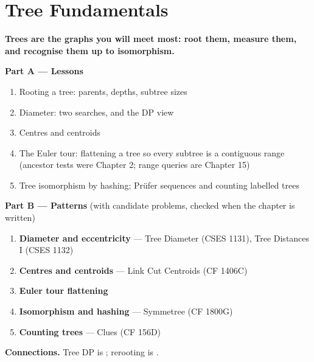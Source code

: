 \chapter{Tree Fundamentals}
\label{ch:tree_basics}

\begin{tcolorbox}[enhanced, colback=white, colframe=secondaryblue, boxrule=1pt, arc=2mm]
\textbf{\large\textcolor{primaryblue}{Trees are the graphs you will meet most: root them, measure them, and recognise them up to isomorphism.}}
\end{tcolorbox}


\begin{plannedbox}
\textbf{Part A --- Lessons}
\begin{enumerate}[leftmargin=*, label=\textbf{A\arabic*.}, itemsep=1pt]
    \item Rooting a tree: parents, depths, subtree sizes
    \item Diameter: two searches, and the DP view
    \item Centres and centroids
    \item The Euler tour: flattening a tree so every subtree is a contiguous range (ancestor tests were Chapter 2; range queries are Chapter 15)
    \item Tree isomorphism by hashing; Pr\"ufer sequences and counting labelled trees
\end{enumerate}
\textbf{Part B --- Patterns} (with candidate problems, checked when the chapter is written)
\begin{enumerate}[leftmargin=*, label=\textbf{P\arabic*.}, itemsep=1pt]
    \item \textbf{Diameter and eccentricity} --- Tree Diameter {\small\color{darkgray}(CSES 1131)}, Tree Distances I {\small\color{darkgray}(CSES 1132)}
    \item \textbf{Centres and centroids} --- Link Cut Centroids {\small\color{darkgray}(CF 1406C)}
    \item \textbf{Euler tour flattening}
    \item \textbf{Isomorphism and hashing} --- Symmetree {\small\color{darkgray}(CF 1800G)}
    \item \textbf{Counting trees} --- Clues {\small\color{darkgray}(CF 156D)}
\end{enumerate}
\textbf{Connections.} Tree DP is ; rerooting is .
\end{plannedbox}
